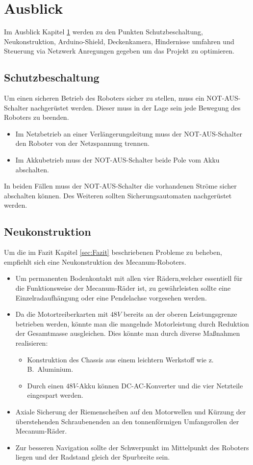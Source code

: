 
\section{Ausblick}
\label{sec:Ausblick}
Im Ausblick Kapitel \ref{sec:Ausblick} werden zu den Punkten Schutzbeschaltung, Neukonstruktion, Arduino-Shield, Deckenkamera, Hindernisse umfahren und Steuerung via Netzwerk Anregungen gegeben um das Projekt zu optimieren.

\subsection{Schutzbeschaltung}
\label{sec:Schutzbeschaltung}
Um einen sicheren Betrieb des Roboters sicher zu stellen, muss ein NOT-AUS-Schalter nachgerüstet werden. Dieser muss in der Lage sein jede Bewegung des Roboters zu beenden.
\begin{itemize}
\item{Im Netzbetrieb an einer Verlängerungsleitung muss der NOT-AUS-Schalter den Roboter von der Netzspannung trennen.}
\item{Im Akkubetrieb muss der NOT-AUS-Schalter beide Pole vom Akku abschalten.}
\end{itemize}
In beiden Fällen muss der NOT-AUS-Schalter die vorhandenen Ströme sicher abschalten können. Des Weiteren sollten Sicherungsautomaten nachgerüstet werden. 

\subsection{Neukonstruktion}
\label{sec:Neukonstruktion}
Um die im Fazit Kapitel \ref{sec:Fazit} beschriebenen Probleme zu beheben, empfiehlt sich eine Neukonstruktion des Mecanum-Roboters.
\begin{itemize}
\item{Um permanenten Bodenkontakt mit allen vier Rädern,welcher essentiell für die Funktionsweise der Mecanum-Räder ist, zu gewährleisten sollte eine Einzelradaufhängung oder eine Pendelachse vorgesehen werden.}
\item{Da die Motortreiberkarten mit $48V$ bereits an der oberen Leistungsgrenze betrieben werden, könnte man die mangelnde Motorleistung durch Reduktion der Gesamtmasse ausgleichen. Dies könnte man durch diverse Maßnahmen realisieren:
\begin {itemize}
\item{Konstruktion des Chassis aus einem leichtern Werkstoff wie z.\,B.\ Aluminium.}
\item{Durch einen $48V$-Akku können DC-AC-Konverter und die vier Netzteile eingespart werden.}
\end{itemize}
}
\item{Axiale Sicherung der Riemenscheiben auf den Motorwellen und Kürzung der überstehenden Schraubenenden an den tonnenförmigen Umfangsrollen der Mecanum-Räder.}
\item{Zur besseren Navigation sollte der Schwerpunkt im Mittelpunkt des Roboters liegen und der Radstand gleich der Spurbreite sein.}
\end{itemize}

